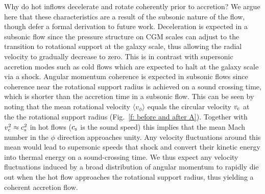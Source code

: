 \documentclass[fleqn,usenatbib]{mnras}
\begin{document}



Why do hot inflows decelerate and rotate coherently prior to accretion?
We argue here that these characteristics are a result of the subsonic nature of the flow, though defer a formal derivation to future work. 
Deceleration is expected in a subsonic flow since the pressure structure on CGM scales can adjust to the transition to rotational support at the galaxy scale, thus allowing the radial velocity to gradually decrease to zero.
This is in contrast with supersonic accretion modes such as cold flows which are expected to halt at the galaxy scale via a shock. 
Angular momentum coherence is expected in subsonic flows since coherence near the rotational support radius is achieved on a sound crossing time, which is shorter than the accretion time in a subsonic flow.
This can be seen by noting that the mean rotational velocity $\langle v_\phi \rangle$ equals the circular velocity $v_{\rm c}$ at the the rotational support radius (Fig.~\ref{f: before and after A}).
Together with  $v_{\rm c}^2\approx c_{\rm s}^2$ in hot flows ($c_{\rm s}$ is the sound speed) this implies that the mean Mach number in the $\phi$ direction approaches unity.
Any velocity fluctuations around this mean would lead to supersonic speeds that shock and convert their kinetic energy into thermal energy on a sound-crossing time.
We thus expect any velocity fluctuations induced by a broad distribution of angular momentum to rapidly die out when the hot flow approaches the rotational support radius, thus yielding a coherent accretion flow.
\end{document}
